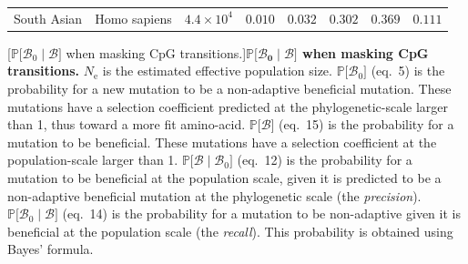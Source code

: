 \documentclass{article}
\newcommand{\Ne}{N_{\text{e}}}
\newcommand{\proba}{\mathbb{P}}
\newcommand{\SphyBen}{\mathcal{B}_0}
\newcommand{\given}{\mid}
\newcommand{\SpopBen}{\mathcal{B}}
\begin{document}
\begin{center}
\begin{longtable*}{|l|l|r|r|r|r|r|r|}
            South Asian & Homo sapiens & $4.4\times 10^{4}$ & $ 0.010$ & $ 0.032$ & $ 0.302$ & $ 0.369$ & $ 0.111$ \\
        \end{longtable*}
        [$\proba{[}\SphyBen\given \SpopBen {]}$ when masking CpG transitions.]{\textbf{$\bm{\proba{[}\SphyBen\given \SpopBen {]}}$ when masking CpG transitions.}
        $\Ne$ is the estimated effective population size.
        $\proba{[} \SphyBen {]}$ (eq.~5) is the probability for a new mutation to be a non-adaptive beneficial mutation.
        These mutations have a selection coefficient predicted at the phylogenetic-scale larger than 1, thus toward a more fit amino-acid.
        $\proba{[} \SpopBen {]}$ (eq.~15) is the probability for a mutation to be beneficial.
        These mutations have a selection coefficient at the population-scale larger than 1.
        $\proba{[} \SpopBen \given \SphyBen{]}$ (eq.~12) is the probability for a mutation to be beneficial at the population scale, given it is predicted to be a non-adaptive beneficial mutation at the phylogenetic scale (the \textit{precision}).
        $\proba{[} \SphyBen \given \SpopBen{]}$ (eq.~14) is the probability for a mutation to be non-adaptive given it is beneficial at the population scale (the \textit{recall}).
        This probability is obtained using Bayes' formula.\label{table:no-CpG-bayes}}
    \end{center}

    \newpage
\end{document}
